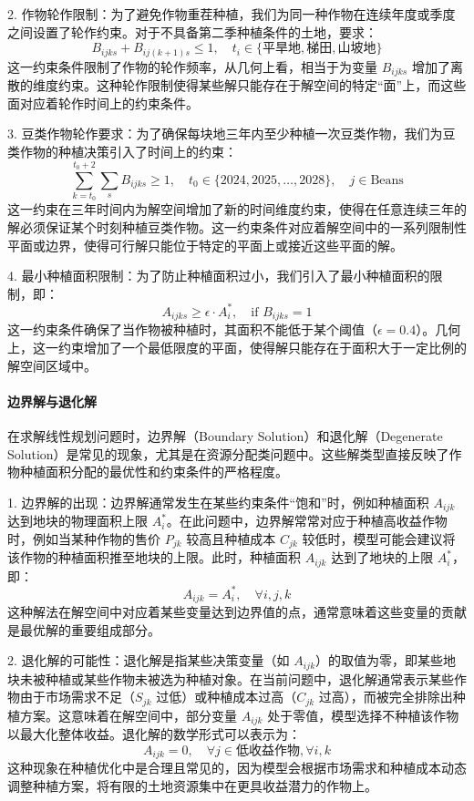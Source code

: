 \documentclass[12pt,a4paper]{nmmcm}
\begin{document}
2. 作物轮作限制：为了避免作物重茬种植，我们为同一种作物在连续年度或季度之间设置了轮作约束。对于不具备第二季种植条件的土地，要求：
\[
  B_{ijks} + B_{ij(k+1)s} \leq 1, \quad t_i \in \{\text{平旱地}, \text{梯田}, \text{山坡地}\}
\]
这一约束条件限制了作物的轮作频率，从几何上看，相当于为变量 $B_{ijks}$ 增加了离散的维度约束。这种轮作限制使得某些解只能存在于解空间的特定“面”上，而这些面对应着轮作时间上的约束条件。

3. 豆类作物轮作要求：为了确保每块地三年内至少种植一次豆类作物，我们为豆类作物的种植决策引入了时间上的约束：
\[
  \sum_{k=t_0}^{t_0+2} \sum_s B_{ijks} \geq 1, \quad t_0 \in \{2024, 2025, \dots, 2028\}, \quad j \in \text{Beans}
\]
这一约束在三年时间内为解空间增加了新的时间维度约束，使得在任意连续三年的解必须保证某个时刻种植豆类作物。这一约束条件对应着解空间中的一系列限制性平面或边界，使得可行解只能位于特定的平面上或接近这些平面的解。

4. 最小种植面积限制：为了防止种植面积过小，我们引入了最小种植面积的限制，即：
\[
  A_{ijks} \geq \epsilon \cdot A_i^*, \quad \text{if } B_{ijks} = 1
\]
这一约束条件确保了当作物被种植时，其面积不能低于某个阈值（$\epsilon = 0.4$）。几何上，这一约束增加了一个最低限度的平面，使得解只能存在于面积大于一定比例的解空间区域中。

\paragraph{边界解与退化解}

在求解线性规划问题时，边界解（Boundary Solution）和退化解（Degenerate Solution）是常见的现象，尤其是在资源分配类问题中。这些解类型直接反映了作物种植面积分配的最优性和约束条件的严格程度。

1. 边界解的出现：边界解通常发生在某些约束条件“饱和”时，例如种植面积 $A_{ijk}$ 达到地块的物理面积上限 $A_i^*$。在此问题中，边界解常常对应于种植高收益作物时，例如当某种作物的售价 $P_{jk}$ 较高且种植成本 $C_{jk}$ 较低时，模型可能会建议将该作物的种植面积推至地块的上限。此时，种植面积 $A_{ijk}$ 达到了地块的上限 $A_i^*$，即：
\[
  A_{ijk} = A_i^*, \quad \forall i, j, k
\]
这种解法在解空间中对应着某些变量达到边界值的点，通常意味着这些变量的贡献是最优解的重要组成部分。

2. 退化解的可能性：退化解是指某些决策变量（如 $A_{ijk}$）的取值为零，即某些地块未被种植或某些作物未被选为种植对象。在当前问题中，退化解通常表示某些作物由于市场需求不足（$S_{jk}$ 过低）或种植成本过高（$C_{jk}$ 过高），而被完全排除出种植方案。这意味着在解空间中，部分变量 $A_{ijk}$ 处于零值，模型选择不种植该作物以最大化整体收益。退化解的数学形式可以表示为：
\[
  A_{ijk} = 0, \quad \forall j \in \text{低收益作物}, \forall i, k
\]
这种现象在种植优化中是合理且常见的，因为模型会根据市场需求和种植成本动态调整种植方案，将有限的土地资源集中在更具收益潜力的作物上。
\end{document}

